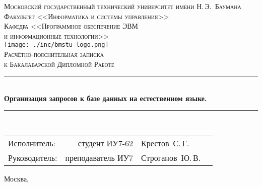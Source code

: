 \newcommand{\HRule}{\rule{\linewidth}{.5mm}\\}

\begin{center}

\textsc{\large Московский государственный технический университет имени Н.\,Э.~Баумана}\\[5mm]
\textsc{Факультет <<Информатика и системы управления>>}\\
\textsc{Кафедра <<Программное обеспечение ЭВМ\\и информационные технологии>>}\\[2.5mm]

\texttt{[image: ./inc/bmstu-logo.png]}\\[2.25cm]

\textsc{\large Расчётно-пояснительная записка}\\
\textsc{к Бакалаварской Дипломной Работе}

\HRule
{\huge \bfseries Организация запросов к базе данных на естественном языке.}
\HRule

\vfill

\begin{flushright}
  \begin{tabular}{lrlc}
    Исполнитель:  &    студент ИУ7-62 & Крестов~С.\,Г.   & \underline{\hspace{3cm}}\\[1cm]
    Руководитель: & преподаватель ИУ7 & Строганов~Ю.\,В. & \underline{\hspace{3cm}}\\[1cm]
  \end{tabular}
\end{flushright}

{\large Москва, \the\year}

\end{center}

\newpage
{}
